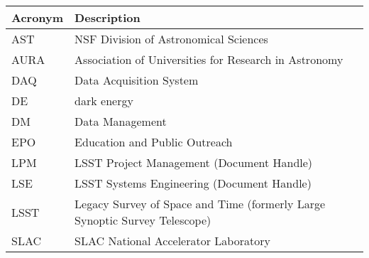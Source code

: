 \addtocounter{table}{-1}
\begin{longtable}{p{}p{}}\hline
\textbf{Acronym} & \textbf{Description}  \\\hline

AST & NSF Division of Astronomical Sciences \\\hline
AURA & Association of Universities for Research in Astronomy \\\hline
DAQ & Data Acquisition System \\\hline
DE & dark energy \\\hline
DM & Data Management \\\hline
EPO & Education and Public Outreach \\\hline
LPM & LSST Project Management (Document Handle) \\\hline
LSE & LSST Systems Engineering (Document Handle) \\\hline
LSST & Legacy Survey of Space and Time (formerly Large Synoptic Survey Telescope) \\\hline
SLAC & SLAC National Accelerator Laboratory \\\hline
\end{longtable}
